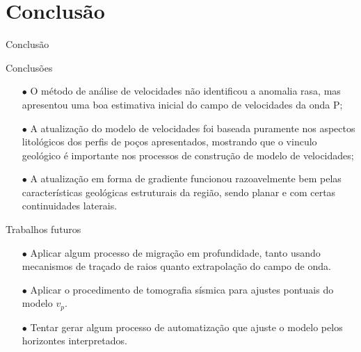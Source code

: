 \documentclass[xcolor=dvipsnames,t]{beamer}
\begin{document}
\section{Conclusão}
\begin{frame}{}
	\bigskip\bigskip\bigskip\bigskip\bigskip\bigskip
	\begin{center}
		\Huge Conclusão
	\end{center}    
\end{frame}
\begin{frame}{Conclusões}
	\bigskip
	\begin{itemize}
		\item[$\bullet$] O método de análise de velocidades não identificou a anomalia rasa, mas apresentou uma boa estimativa inicial do campo de velocidades da onda P;
		
		\bigskip\pause 
		\item[$\bullet$] A atualização do modelo de velocidades foi baseada puramente nos aspectos litológicos dos perfis de poços apresentados, mostrando que o vinculo geológico é importante nos processos de construção de modelo de velocidades;
		
		\bigskip\pause
		\item[$\bullet$] A atualização em forma de gradiente funcionou razoavelmente bem pelas características geológicas estruturais da região, sendo planar e com certas continuidades laterais.  
	\end{itemize}
	
\end{frame}
\begin{frame}{Trabalhos futuros}
	
	\bigskip
	\begin{itemize}
		\item[$\bullet$] Aplicar algum processo de migração em profundidade, tanto usando mecanismos de traçado de raios quanto extrapolação do campo de onda. 
	
		\bigskip\pause 
		\item[$\bullet$] Aplicar o procedimento de tomografia sísmica para ajustes pontuais do modelo $v_p$.
	
		\bigskip\pause
		\item[$\bullet$] Tentar gerar algum processo de automatização que ajuste o modelo pelos horizontes interpretados.  
	\end{itemize}
		
\end{frame}
\end{document}
